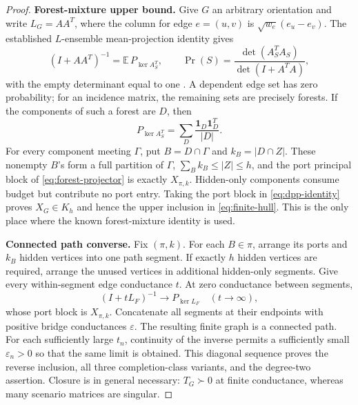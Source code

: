 \documentclass[11pt]{article}
\theoremstyle{definition}
\theoremstyle{remark}
\newcommand{\one}{\mathbf 1}
\begin{document}
\begin{proof}
\textbf{Forest-mixture upper bound.}
Give $G$ an arbitrary orientation and write $L_G=AA^T$, where the column for
edge $e=(u,v)$ is $\sqrt{w_e}(e_u-e_v)$.  The established $L$-ensemble
mean-projection identity gives
\begin{equation}
  (I+AA^T)^{-1}
  =\mathbb E\,P_{\ker A_S^T},
  \qquad
  \Pr(S)=\frac{\det(A_S^TA_S)}{\det(I+A^TA)},
  \label{eq:dpp-identity}
\end{equation}
with the empty determinant equal to one
\cite{derezinski2020,kassel2023}.  A dependent edge set has zero probability;
for an incidence matrix, the remaining sets are precisely forests.  If the
components of such a forest are $D$, then
\begin{equation}
  P_{\ker A_S^T}=\sum_D\frac{\one_D\one_D^T}{|D|}.
  \label{eq:forest-projector}
\end{equation}
For every component meeting $\Gamma$, put $B=D\cap\Gamma$ and
$k_B=|D\cap Z|$.  These nonempty $B$'s form a full partition of $\Gamma$,
$\sum_Bk_B\leq|Z|\leq h$, and the port principal block of
\eqref{eq:forest-projector} is exactly $X_{\pi,k}$.  Hidden-only components
consume budget but contribute no port entry.  Taking the port block in
\eqref{eq:dpp-identity} proves
$X_G\in K_h$ and hence the upper inclusion in \eqref{eq:finite-hull}.  This is
the only place where the known forest-mixture identity is used.

\textbf{Connected path converse.}
Fix $(\pi,k)$.  For each $B\in\pi$, arrange its ports and $k_B$ hidden
vertices into one path segment.  If exactly $h$ hidden vertices are required,
arrange the unused vertices in additional hidden-only segments.  Give every
within-segment edge conductance $t$.  At zero conductance between segments,
\begin{equation}
  (I+tL_F)^{-1}\longrightarrow P_{\ker L_F}
  \quad(t\to\infty),
  \label{eq:high-conductance}
\end{equation}
whose port block is $X_{\pi,k}$.  Concatenate all segments at their endpoints
with positive bridge conductances $\varepsilon$.  The resulting finite graph
is a connected path.  For each sufficiently large $t_n$, continuity of the
inverse permits a sufficiently small $\varepsilon_n>0$ so that the same limit
is obtained.  This diagonal sequence proves the reverse inclusion, all three
completion-class variants, and the degree-two assertion.  Closure is in
general necessary: $T_G\succ0$ at finite conductance, whereas many scenario
matrices are singular.


\end{proof}
\end{document}
